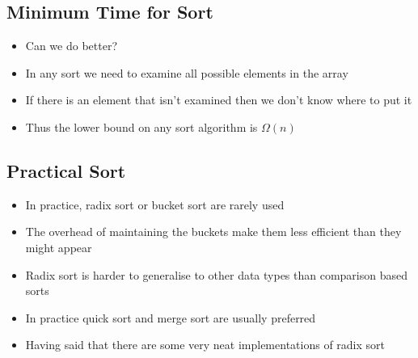 \begin{slide}
\section{Minimum Time for Sort}

\begin{PauseHighLight}
  \begin{itemize}
  \item Can we do better?\pause
  \item In any sort we need to examine all possible elements in the
    array\pause
  \item If there is an element that isn't examined then we don't know
    where to put it\pause
  \item Thus the lower bound on any sort algorithm is $\Omega(n)$\pause
  \end{itemize}
\end{PauseHighLight}

\end{slide}


\begin{slide}
\section[-0.5]{Practical Sort}

\begin{PauseHighLight}
  \begin{itemize}
  \item In practice, radix sort or bucket sort are rarely used\pause
  \item The overhead of maintaining the buckets make them less efficient
    than they might appear\pause
  \item Radix sort is harder to generalise to other data types than
    comparison based sorts\pause
  \item In practice quick sort and merge sort are usually
    preferred\pause
  \item Having said that there are some very neat implementations of
    radix sort\pause
  \end{itemize}
\end{PauseHighLight}

\end{slide}


